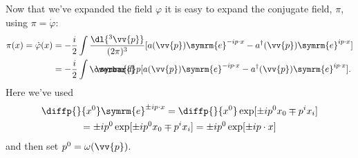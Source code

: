 \documentclass[fleqn]{NotesClass}
\newcommand{\e}{\symrm{e}}
\newcommand{\hermit}{{\dagger}}
\newcommand\dbar{\ThisStyle{\ensurestackMath{%
            \stackengine{-.3\LMpt}{\SavedStyle \symrm{d}}{\SavedStyle\overbar{}%
                \mkern2.25mu}{O}{r}{F}{F}{L}}}}
\newcommand{\invariantmeasure}[1]{\dbar #1}
\begin{document}
    Now that we've expanded the field \(\varphi\) it is easy to expand the conjugate field, \(\pi\), using \(\pi = \dot{\varphi}\):
    \begin{align}
        \pi(x) = \dot{\varphi}(x) &= -\frac{i}{2} \int \frac{\dl{^3\vv{p}}}{(2\pi)^3} [a(\vv{p}) \e^{-ip\cdot x} - a^\hermit(\vv{p}) \e^{ip \cdot x}]\\
        &= -\frac{i}{2} \int \invariantmeasure{p} [a(\vv{p}) \e^{-ip\cdot x} - a^\hermit(\vv{p}) \e^{ip \cdot x}].
    \end{align}
    Here we've used
    \begin{multline}
        \diffp{}{x^0} \e^{\pm ip \cdot x} = \diffp{}{x^0} \exp[\pm ip^0x_0 \mp p^ix_i]\\
        = \pm ip^0 \exp[\pm ip^0x_0 \mp p^ix_i] = \pm i p^0 \exp[\pm ip \cdot x]
    \end{multline}
    and then set \(p^0 = \omega(\vv{p})\).
    
\end{document}
